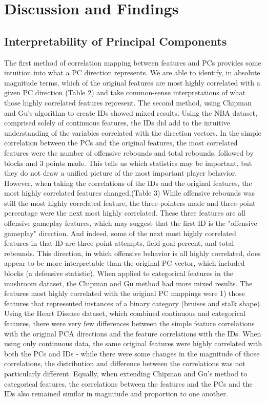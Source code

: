 \documentclass{article}
\begin{document}
\section{Discussion and Findings}{
\subsection{Interpretability of Principal Components}{
The first method of correlation mapping between features and PCs provides some intuition into what a PC direction represents. We are able to identify, in absolute magnitude terms, which of the original features are most highly correlated with a given PC direction (Table 2) and take common-sense interpretations of what those highly correlated features represent.
The second method, using Chipman and Gu’s algorithm to create IDs showed mixed results. Using the NBA dataset, comprised solely of continuous features, the IDs did add to the intuitive understanding of the variables correlated with the direction vectors. In the simple correlation between the PCs and the original features, the most correlated features were the number of offensive rebounds and total rebounds, followed by blocks and 3 points made. This tells us which statistics may be important, but they do not draw a unified picture of the most important player behavior. However, when taking the correlations of the IDs and the original features, the most highly correlated features changed.(Table 3) While offensive rebounds was still the most highly correlated feature, the three-pointers made and three-point percentage were the next most highly correlated. These three features are all offensive gameplay features, which may suggest that the first ID is the "offensive gameplay" direction. And indeed, some of the next most highly correlated features in that ID are three point attempts, field goal percent, and total rebounds. This direction, in which offensive behavior is all highly correlated, does appear to be more interpretable than the original PC vector, which included blocks (a defensive statistic).
When applied to categorical features in the mushroom dataset, the Chipman and Gu method had more mixed results. The features most highly correlated with the original PC mappings were 1) those features that represented instances of a binary category (bruises and stalk shape).
Using the Heart Disease dataset, which combined continuous and categorical features, there were very few differences between the simple feature correlations with the original PCA directions and the feature correlations with the IDs. When using only continuous data, the same original features were highly correlated with both the PCs and IDs - while there were some changes in the magnitude of those correlations, the distribution and difference between the correlations was not particularly different. Equally, when extending Chipman and Gu’s method to categorical features, the correlations between the features and the PCs and the IDs also remained similar in magnitude and proportion to one another.
}

}
\end{document}
